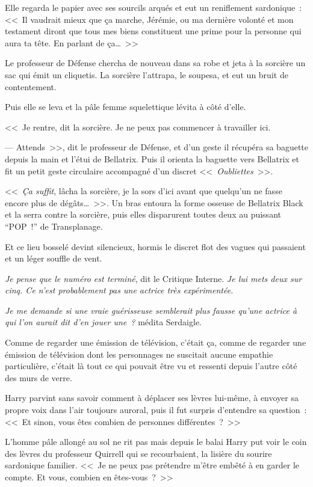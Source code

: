 Elle regarda le papier avec ses sourcils arqués et eut un reniflement sardonique~: <<~Il vaudrait mieux que ça marche, Jérémie, ou ma dernière volonté et mon testament diront que tous mes biens constituent une prime pour la personne qui aura ta tête. En parlant de ça…~>>

Le professeur de Défense chercha de nouveau dans sa robe et jeta à la sorcière un sac qui émit un cliquetis. La sorcière l'attrapa, le soupesa, et eut un bruit de contentement.

Puis elle se leva et la pâle femme squelettique lévita à côté d'elle.

<<~Je rentre, dit la sorcière. Je ne peux pas commencer à travailler ici.

--- Attends~>>, dit le professeur de Défense, et d'un geste il récupéra sa baguette depuis la main et l'étui de Bellatrix. Puis il orienta la baguette vers Bellatrix et fit un petit geste circulaire accompagné d'un discret <<~\emph{Oubliettes}~>>.

<<~\emph{Ça suffit}, lâcha la sorcière, je la sors d'ici avant que quelqu'un ne fasse encore plus de dégâts…~>>. Un bras entoura la forme osseuse de Bellatrix Black et la serra contre la sorcière, puis elles disparurent toutes deux au puissant “POP~!” de Transplanage.

Et ce lieu bosselé devint silencieux, hormis le discret flot des vagues qui passaient et un léger souffle de vent.

\emph{Je pense que le numéro est terminé}, dit le Critique Interne. \emph{Je lui mets deux sur cinq. Ce n'est probablement pas une actrice très expérimentée.}

\emph{Je me demande si une vraie guérisseuse semblerait plus fausse qu'une actrice à qui l'on aurait dit d'en jouer une~?} médita Serdaigle.

Comme de regarder une émission de télévision, c'était ça, comme de regarder une émission de télévision dont les personnages ne suscitait aucune empathie particulière, c'était là tout ce qui pouvait être vu et ressenti depuis l'autre côté des murs de verre.

Harry parvint sans savoir comment à déplacer ses lèvres lui-même, à envoyer sa propre voix dans l'air toujours auroral, puis il fut surpris d'entendre sa question~: <<~Et sinon, vous êtes combien de personnes différentes~?~>>

L'homme pâle allongé au sol ne rit pas mais depuis le balai Harry put voir le coin des lèvres du professeur Quirrell qui se recourbaient, la lisière du sourire sardonique familier. <<~Je ne peux pas prétendre m'être embêté à en garder le compte. Et vous, combien en êtes-vous~?~>>

